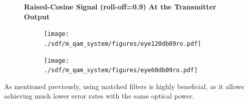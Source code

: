 \begin{refsection}
\begin{table}[H]
\begin{tabular}{|l|l|}
	\end{tabular}
\end{table}

\begin{figure}[H]
	\centering
	\textbf{Raised-Cosine Signal (roll-off=0.9) At the Transmitter Output}
	\begin{subfigure}{.5\textwidth}
		\centering
		\texttt{[image: ./sdf/m\_qam\_system/figures/eye120db09ro.pdf]}
	\end{subfigure}%
	\begin{subfigure}{.5\textwidth}
		\centering
		\texttt{[image: ./sdf/m\_qam\_system/figures/eye60db09ro.pdf]}
	\end{subfigure}
	\caption{\label{fig:eyespower}}
\end{figure}

As mentioned previously, using matched filters is highly beneficial, as it
allows achieving much lower error rates with the same optical power.


\end{refsection}
